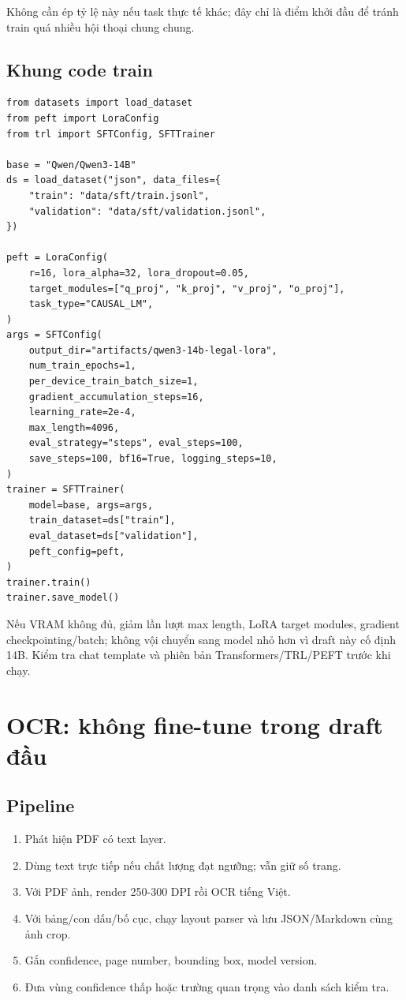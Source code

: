 \documentclass[11pt,a4paper]{article}
\begin{document}
Không cần ép tỷ lệ này nếu task thực tế khác; đây chỉ là điểm khởi đầu để tránh train quá nhiều hội thoại chung chung.

\subsection{Khung code train}

\begin{lstlisting}[basicstyle=\ttfamily\scriptsize,frame=single,rulecolor=\color{bluegray},breaklines=true]
from datasets import load_dataset
from peft import LoraConfig
from trl import SFTConfig, SFTTrainer

base = "Qwen/Qwen3-14B"
ds = load_dataset("json", data_files={
    "train": "data/sft/train.jsonl",
    "validation": "data/sft/validation.jsonl",
})

peft = LoraConfig(
    r=16, lora_alpha=32, lora_dropout=0.05,
    target_modules=["q_proj", "k_proj", "v_proj", "o_proj"],
    task_type="CAUSAL_LM",
)
args = SFTConfig(
    output_dir="artifacts/qwen3-14b-legal-lora",
    num_train_epochs=1,
    per_device_train_batch_size=1,
    gradient_accumulation_steps=16,
    learning_rate=2e-4,
    max_length=4096,
    eval_strategy="steps", eval_steps=100,
    save_steps=100, bf16=True, logging_steps=10,
)
trainer = SFTTrainer(
    model=base, args=args,
    train_dataset=ds["train"],
    eval_dataset=ds["validation"],
    peft_config=peft,
)
trainer.train()
trainer.save_model()
\end{lstlisting}

Nếu VRAM không đủ, giảm lần lượt max length, LoRA target modules,
gradient checkpointing/batch; không vội chuyển sang model nhỏ hơn vì
draft này cố định 14B. Kiểm tra chat template và phiên bản
Transformers/TRL/PEFT trước khi chạy.

\section{OCR: không fine-tune trong draft đầu}

\subsection{Pipeline}

\begin{enumerate}
  \item Phát hiện PDF có text layer.
  \item Dùng text trực tiếp nếu chất lượng đạt ngưỡng; vẫn giữ số trang.
  \item Với PDF ảnh, render 250-300 DPI rồi OCR tiếng Việt.
  \item Với bảng/con dấu/bố cục, chạy layout parser và lưu JSON/Markdown cùng ảnh crop.
  \item Gắn confidence, page number, bounding box, model version.
  \item Đưa vùng confidence thấp hoặc trường quan trọng vào danh sách kiểm tra.
\end{enumerate}
\end{document}

